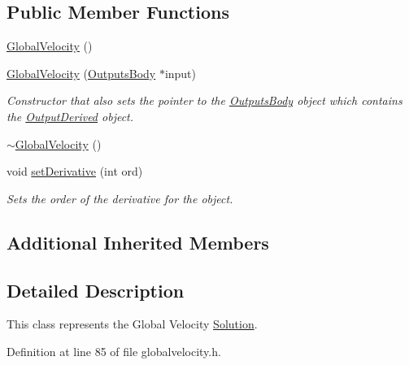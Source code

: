 \subsection*{Public Member Functions}
\begin{DoxyCompactItemize}
\item 
\hyperlink{classosea_1_1ofreq_1_1_global_velocity_a444ab39b351acd4e6ca7dc8088e2a9b8}{Global\-Velocity} ()
\item 
\hyperlink{classosea_1_1ofreq_1_1_global_velocity_a7992180d42ae3558cdcccfe56550ed94}{Global\-Velocity} (\hyperlink{classosea_1_1ofreq_1_1_outputs_body}{Outputs\-Body} $\ast$input)
\begin{DoxyCompactList}\small\item\em Constructor that also sets the pointer to the \hyperlink{classosea_1_1ofreq_1_1_outputs_body}{Outputs\-Body} object which contains the \hyperlink{classosea_1_1ofreq_1_1_output_derived}{Output\-Derived} object. \end{DoxyCompactList}\item 
\hyperlink{classosea_1_1ofreq_1_1_global_velocity_a2b8f719180b1786a582d90603db8f2d8}{$\sim$\-Global\-Velocity} ()
\item 
void \hyperlink{classosea_1_1ofreq_1_1_global_velocity_a11229a6dbc7f85f3c321b5eddb127f10}{set\-Derivative} (int ord)
\begin{DoxyCompactList}\small\item\em Sets the order of the derivative for the object. \end{DoxyCompactList}\end{DoxyCompactItemize}
\subsection*{Additional Inherited Members}


\subsection{Detailed Description}
This class represents the Global Velocity \hyperlink{classosea_1_1ofreq_1_1_solution}{Solution}. 

Definition at line 85 of file globalvelocity.\-h.



